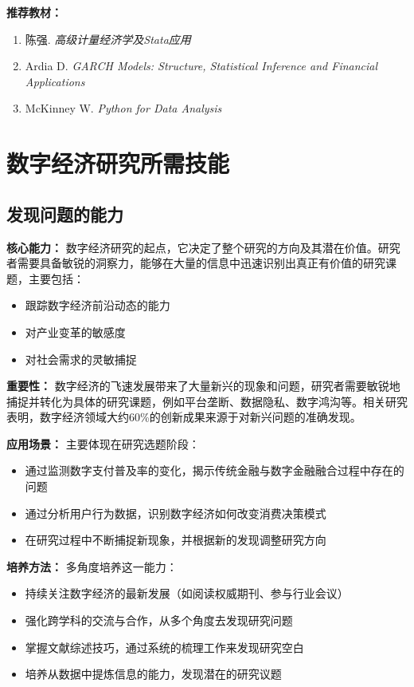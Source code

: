 \documentclass[lang=cn,12pt,a4paper]{elegantpaper}
\begin{document}
\noindent \textbf{推荐教材：}
\begin{enumerate}[leftmargin=*,nosep]
    \item 陈强. \textit{高级计量经济学及Stata应用}
    \item Ardia D. \textit{GARCH Models: Structure, Statistical Inference and Financial Applications}
    \item McKinney W. \textit{Python for Data Analysis}
\end{enumerate}


\section{数字经济研究所需技能}

\subsection{发现问题的能力}
{\textbf{核心能力：}} 数字经济研究的起点，它决定了整个研究的方向及其潜在价值。研究者需要具备敏锐的洞察力，能够在大量的信息中迅速识别出真正有价值的研究课题，主要包括：
\begin{itemize}
    \item 跟踪数字经济前沿动态的能力
    \item 对产业变革的敏感度
    \item 对社会需求的灵敏捕捉
\end{itemize}

{\textbf{重要性：}} 数字经济的飞速发展带来了大量新兴的现象和问题，研究者需要敏锐地捕捉并转化为具体的研究课题，例如平台垄断、数据隐私、数字鸿沟等。相关研究表明，数字经济领域大约60\%的创新成果来源于对新兴问题的准确发现。

{\textbf{应用场景：}} 主要体现在研究选题阶段：
\begin{itemize}
    \item 通过监测数字支付普及率的变化，揭示传统金融与数字金融融合过程中存在的问题
    \item 通过分析用户行为数据，识别数字经济如何改变消费决策模式
    \item 在研究过程中不断捕捉新现象，并根据新的发现调整研究方向
\end{itemize}

{\textbf{培养方法：}} 多角度培养这一能力：
\begin{itemize}
    \item 持续关注数字经济的最新发展（如阅读权威期刊、参与行业会议）
    \item 强化跨学科的交流与合作，从多个角度去发现研究问题
    \item 掌握文献综述技巧，通过系统的梳理工作来发现研究空白
    \item 培养从数据中提炼信息的能力，发现潜在的研究议题
\end{itemize}
\end{document}
